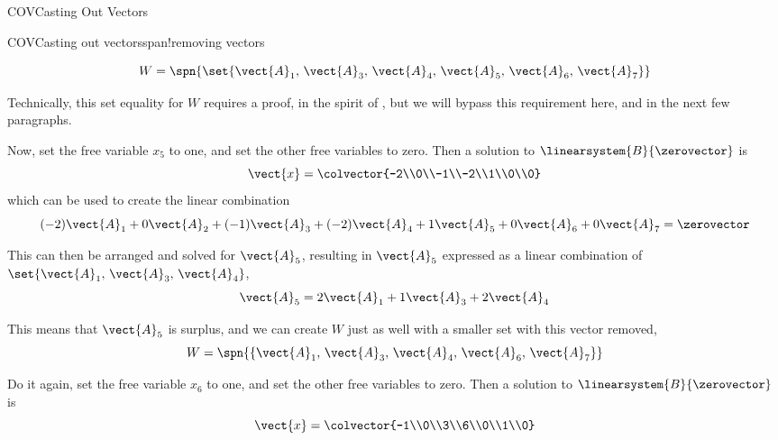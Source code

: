 \begin{subsect}{COV}{Casting Out Vectors}
\begin{example}{COV}{Casting out vectors}{span!removing vectors}
\begin{para}
%
\begin{equation*}
W=\spn{\set{\vect{A}_1,\,\vect{A}_3,\,\vect{A}_4,\,\vect{A}_5,\,\vect{A}_6,\,\vect{A}_7}}
\end{equation*}
\end{para}
%
\begin{para}Technically, this set equality for $W$ requires a proof, in the spirit of , but we will bypass this requirement here, and in the next few paragraphs.\end{para}
%
\begin{para}Now, set the free variable $x_5$ to one, and set the other free variables to zero.  Then a solution to $\linearsystem{B}{\zerovector}$ is
%
\begin{equation*}
\vect{x}=\colvector{-2\\0\\-1\\-2\\1\\0\\0}
\end{equation*}
%
which can be used to create the linear combination
%
\begin{equation*}
(-2)\vect{A}_1+
0\vect{A}_2+
(-1)\vect{A}_3+
(-2)\vect{A}_4+
1\vect{A}_5+
0\vect{A}_6+
0\vect{A}_7
=\zerovector
\end{equation*}
\end{para}
%
\begin{para}This can then be arranged and solved for $\vect{A}_5$, resulting in $\vect{A}_5$ expressed as a linear combination of $\set{\vect{A}_1,\,\vect{A}_3,\,\vect{A}_4}$,
%
\begin{equation*}
\vect{A}_5=
2\vect{A}_1+
1\vect{A}_3+
2\vect{A}_4
\end{equation*}
\end{para}
%
\begin{para}This means that $\vect{A}_5$ is surplus, and we can create $W$ just as well with a smaller set with  this vector removed,
%
\begin{equation*}
W=\spn{\left\{\vect{A}_1,\,\vect{A}_3,\,\vect{A}_4,\,\vect{A}_6,\,\vect{A}_7\right\}}
\end{equation*}
\end{para}
%
\begin{para}Do it again, set the free variable $x_6$ to one, and set the other free variables to zero.  Then a solution to $\linearsystem{B}{\zerovector}$ is
%
\begin{equation*}
\vect{x}=\colvector{-1\\0\\3\\6\\0\\1\\0}

\end{equation*}
\end{para}
\end{example}
\end{subsect}
